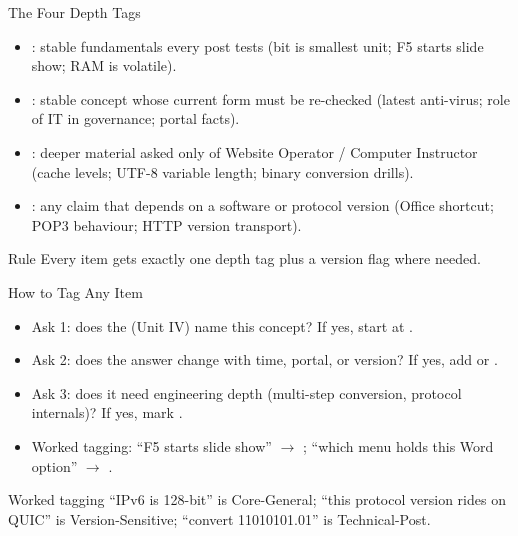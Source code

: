 \documentclass[aspectratio=169]{beamer}
\begin{document}
\begin{frame}{The Four Depth Tags}
  \begin{itemize}
    \item {}: stable fundamentals every post tests (bit is smallest unit; F5 starts slide show; RAM is volatile).
    \item {}: stable concept whose current form must be re-checked (latest anti-virus; role of IT in governance; portal facts).
    \item {}: deeper material asked only of Website Operator / Computer Instructor (cache levels; UTF-8 variable length; binary conversion drills).
    \item {}: any claim that depends on a software or protocol version (Office shortcut; POP3 behaviour; HTTP version transport).
  \end{itemize}
  \begin{block}{Rule}
    Every item gets exactly one depth tag plus a version flag where needed.
  \end{block}
\end{frame}

\begin{frame}{How to Tag Any Item}
  \begin{itemize}
    \item Ask 1: does the  (Unit IV) name this concept? If yes, start at .
    \item Ask 2: does the answer change with time, portal, or version? If yes, add  or .
    \item Ask 3: does it need engineering depth (multi-step conversion, protocol internals)? If yes, mark .
    \item Worked tagging: ``F5 starts slide show'' $\rightarrow$ ; ``which menu holds this Word option'' $\rightarrow$ .
  \end{itemize}
  \begin{exampleblock}{Worked tagging}
    ``IPv6 is 128-bit'' is Core-General; ``this protocol version rides on QUIC'' is Version-Sensitive; ``convert 11010101.01'' is Technical-Post.
  \end{exampleblock}
\end{frame}
\end{document}
